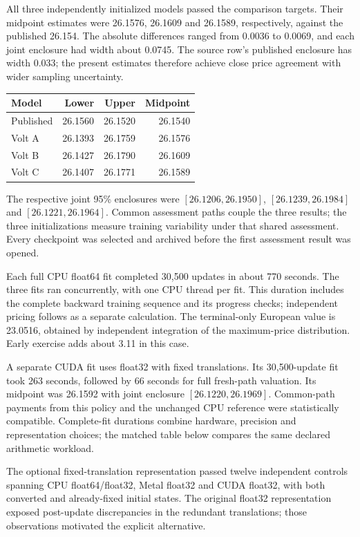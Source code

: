 All three independently initialized models passed the comparison targets.
Their midpoint estimates were 26.1576, 26.1609 and 26.1589, respectively,
against the published 26.154. The absolute differences ranged from 0.0036 to
0.0069, and each joint enclosure had width about 0.0745. The source row's
published enclosure has width 0.033; the present estimates therefore achieve
close price agreement with wider sampling uncertainty.

\begin{center}
\begin{tabular}{lrrr}
\toprule
Model & Lower & Upper & Midpoint\\
\midrule
Published &26.1560&26.1520&26.1540\\
Volt A &26.1393&26.1759&26.1576\\
Volt B &26.1427&26.1790&26.1609\\
Volt C &26.1407&26.1771&26.1589\\
\bottomrule
\end{tabular}
\end{center}
The respective joint 95\% enclosures were $[26.1206,26.1950]$,
$[26.1239,26.1984]$ and $[26.1221,26.1964]$. Common assessment paths couple
the three results; the three initializations measure training variability
under that shared assessment. Every checkpoint was selected and archived
before the first assessment result was opened.

Each full CPU float64 fit completed 30,500 updates in about 770 seconds.
The three fits ran concurrently, with one CPU thread per fit. This duration
includes the complete backward training sequence and its progress checks;
independent pricing follows as a separate calculation. The terminal-only
European value is 23.0516, obtained by independent integration of the
maximum-price distribution. Early exercise adds about 3.11 in this case.

A separate CUDA fit uses float32 with fixed translations. Its 30,500-update
fit took 263 seconds, followed by 66 seconds for full fresh-path valuation.
Its midpoint was 26.1592 with joint enclosure $[26.1220,26.1969]$. Common-path payments from this
policy and the unchanged CPU reference were statistically compatible.
Complete-fit durations combine hardware, precision and representation choices;
the matched table below compares the same declared arithmetic workload.

The optional fixed-translation representation passed twelve independent
controls spanning CPU float64/float32, Metal float32 and CUDA float32, with
both converted and already-fixed initial states. The original float32
representation exposed post-update discrepancies in the redundant
translations; those observations motivated the explicit alternative.



